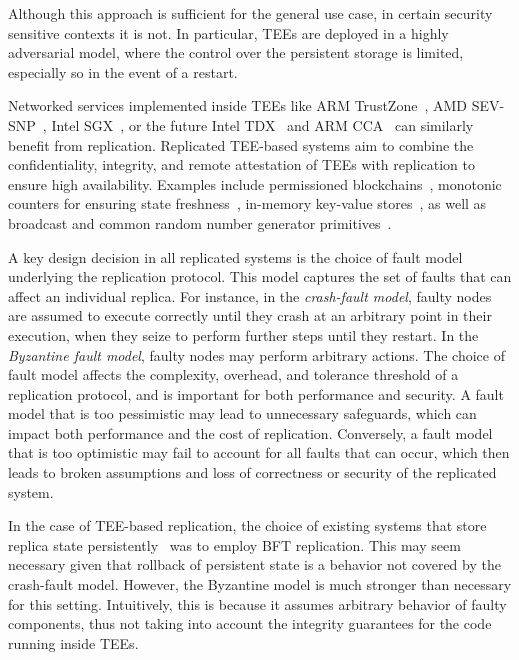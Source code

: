 Although this approach is sufficient for the general use case, in
certain security sensitive contexts it is not. In particular,
\acp{TEE} are deployed in a highly adversarial model, where the
control over the persistent storage is limited, especially so in
the event of a restart.

Networked services implemented inside \acp{TEE} like ARM TrustZone~\cite{armTZ}, AMD SEV-SNP~\cite{amdsev,
  amdsev-snp}, Intel SGX~\cite{intelsgx}, or the future Intel
TDX~\cite{inteltdx} and ARM CCA~\cite{arm-cca} can similarly benefit
from replication.  Replicated \ac{TEE}-based systems aim to combine the
confidentiality, integrity, and remote attestation of \acp{TEE} with
replication to ensure high availability.  Examples include permissioned blockchains~\cite{teechain}, monotonic
counters for ensuring state freshness~\cite{rote}, in-memory key-value
stores~\cite{avocado-atc21}, as well as broadcast and common random
number generator primitives~\cite{p2p-sgx}.

A key design decision in all replicated systems is the choice of fault
model underlying the replication protocol. This model captures the set
of faults that can affect an individual replica.  For instance, in the
{\em crash-fault model}, faulty nodes are assumed to execute correctly
until they crash at an arbitrary point in their execution, when they
seize to perform further steps until they restart. In the {\em
  Byzantine fault model}, faulty nodes may perform arbitrary
actions. The choice of fault model affects the complexity, overhead,
and tolerance threshold of a replication protocol, and is important
for both performance and security. A fault model that is too
pessimistic may lead to unnecessary safeguards, which can impact both
performance and the cost of replication. Conversely, a fault model
that is too optimistic may fail to account for all faults that can
occur, which then leads to broken assumptions and loss of correctness
or security of the replicated system.

In the case of \ac{TEE}-based replication, the choice of existing systems
that store replica state persistently~\cite{teechain,rote} was to
employ \ac{BFT} replication. This may seem
necessary given that rollback of persistent state is a behavior not
covered by the crash-fault model.  However, the Byzantine model is
much stronger than necessary for this setting. Intuitively, this
is because it assumes arbitrary behavior of
faulty components, thus not taking into account the integrity
guarantees for the code running inside \acp{TEE}.

